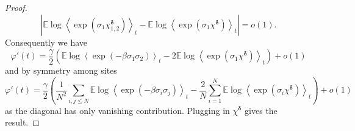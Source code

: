 \documentclass[a4paper,12pt,oneside,reqno]{amsart}
\numberwithin{equation}{section}
\begin{document}
\begin{proof}
\[
\left|{{\mathbb{E}}} \log \left<\exp\left( \sigma_1 \chi^{\boldsymbol{\delta}}_{1,2}\right)\right>_t- {{\mathbb{E}}} \log \left<\exp\left( \sigma_1 \chi^{\boldsymbol{\delta}}\right)\right>_t\right| = o(1).
\]
Consequently we have
$$  \varphi'(t) = \frac{\gamma}{2}\left({{\mathbb{E}}} \log \left<\exp\left( -\beta \sigma_1 \sigma_2\right)\right>_t - 2{{\mathbb{E}}} \log \left<\exp\left( \sigma_1 \chi^{\boldsymbol{\delta}}\right)\right>_t\right)+o(1)$$
and by symmetry among sites
$$  \varphi'(t) = \frac{\gamma}{2}\left(\frac{1}{N^2}\sum\limits_{i,j\leq N}{{\mathbb{E}}} \log \left<\exp\left( -\beta \sigma_i \sigma_j\right)\right>_t -\frac{2}{N}\sum\limits_{i=1}^N  {{\mathbb{E}}} \log \left<\exp\left(\sigma_i \chi^{\boldsymbol{\delta}}\right)\right>_t\right)+o(1)$$
as the diagonal has only vanishing contribution. Plugging in $\chi^{\boldsymbol{\delta}}$ gives the result.
\end{proof}
\end{document}

